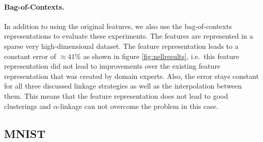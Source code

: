 \begin{table}[H]
  \caption{Proposed Subcategories for ``Kitchen Item''.}
  \label{tbl:kitchenitems}
\end{table}

\paragraph{Bag-of-Contexts.} In addition to using the original features, we also use the bag-of-contexts representations to evaluate these experiments. The features are represented in a sparse very high-dimensional dataset. The feature representation leads to a constant error of $\approx 41\%$ as shown in figure \ref{fig:nellresults}, i.e.\ this feature representation did not lead to improvements over the existing feature representation that was created by domain experts. Also, the error stays constant for all three discussed linkage strategies as well as the interpolation between them. This means that the feature representation does not lead to good clusterings and $\alpha$-linkage can not overcome the problem in this case.

\subsection{MNIST}

